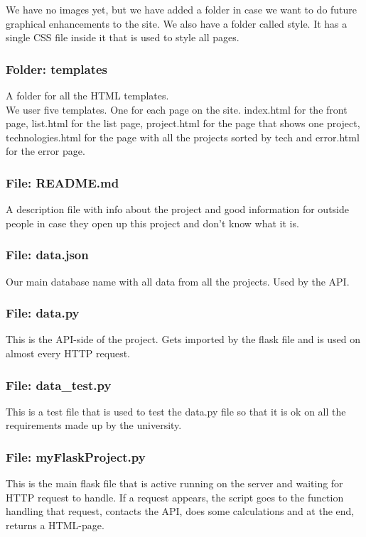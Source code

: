 \documentclass{TDP003mall}
\begin{document}
We have no images yet, but we have added a folder in case we want to do future graphical enhancements to the site. We also have a folder called style. It has a single CSS file inside it that is used to style all pages.\\

\subsubsection{Folder: templates}
A folder for all the HTML templates.\\

We user five templates. One for each page on the site. index.html for the front page, list.html for the list page, project.html for the page that shows one project, technologies.html for the page with all the projects sorted by tech and error.html for the error page.

\subsubsection{File: README.md}
A description file with info about the project and good information for outside people in case they open up this project and don't know what it is.

\subsubsection{File: data.json}
Our main database name with all data from all the projects. Used by the API.

\subsubsection{File: data.py}
This is the API-side of the project. Gets imported by the flask file and is used on almost every HTTP request.

\subsubsection{File: data\_test.py}
This is a test file that is used to test the data.py file so that it is ok on all the requirements made up by the university.

\subsubsection{File: myFlaskProject.py}
This is the main flask file that is active running on the server and waiting for HTTP request to handle. If a request appears, the script goes to the function handling that request, contacts the API, does some calculations and at the end, returns a HTML-page.
\end{document}
